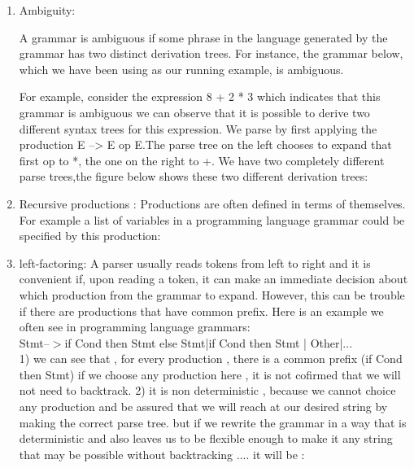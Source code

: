 \begin{enumerate}
\item Ambiguity:

A grammar is ambiguous if some phrase in the language generated by the grammar has two distinct derivation trees. For instance, the grammar below, which we have been using as our running example, is ambiguous.



For example, consider the expression 8 + 2 * 3 which indicates that this grammar is ambiguous we can observe that it is possible to derive two different syntax trees for this expression.
We parse by first applying the production E –> E op E.The parse tree on the left chooses to expand that first op to *, the one on the right to +. We have two completely different parse trees,the figure below shows these two different derivation trees:\\








\item Recursive productions :
Productions are often defined in terms of themselves. For example a list of variables in a programming language grammar could be specified by this production:

\item left-factoring:  A parser usually reads tokens from left to right and it is convenient if, upon reading a token, it can make an immediate decision about which production from the grammar to expand. However, this can be trouble if there are productions that have common prefix. Here is an example we often see in programming language grammars:\\










Stmt–$>$if Cond then Stmt else Stmt|if Cond then Stmt | Other|...\\


1) we can see that , for every production , there is a common prefix (if Cond then Stmt) if we choose any production here , it is not cofirmed that we will not need to backtrack.
2) it is non deterministic , because we cannot choice any production and be assured that we will reach at our desired string by making the correct parse tree. but if we rewrite the grammar in a way that is deterministic and also leaves us to be flexible enough to make it any string that may be possible without backtracking .... it will be : 







\end{enumerate}
